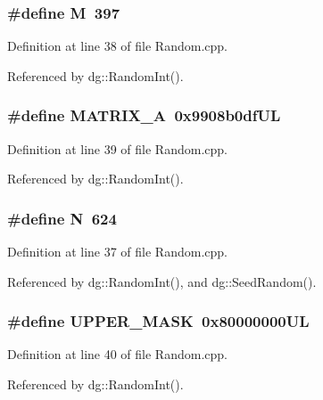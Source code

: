 \subsubsection{\setlength{\rightskip}{0pt plus 5cm}\#define M\ 397}\label{Random_8cpp_a1}




Definition at line 38 of file Random.cpp.

Referenced by dg::Random\-Int().
\subsubsection{\setlength{\rightskip}{0pt plus 5cm}\#define MATRIX\_\-A\ 0x9908b0df\-UL}\label{Random_8cpp_a2}




Definition at line 39 of file Random.cpp.

Referenced by dg::Random\-Int().
\subsubsection{\setlength{\rightskip}{0pt plus 5cm}\#define N\ 624}\label{Random_8cpp_a0}




Definition at line 37 of file Random.cpp.

Referenced by dg::Random\-Int(), and dg::Seed\-Random().
\subsubsection{\setlength{\rightskip}{0pt plus 5cm}\#define UPPER\_\-MASK\ 0x80000000UL}\label{Random_8cpp_a3}




Definition at line 40 of file Random.cpp.

Referenced by dg::Random\-Int().